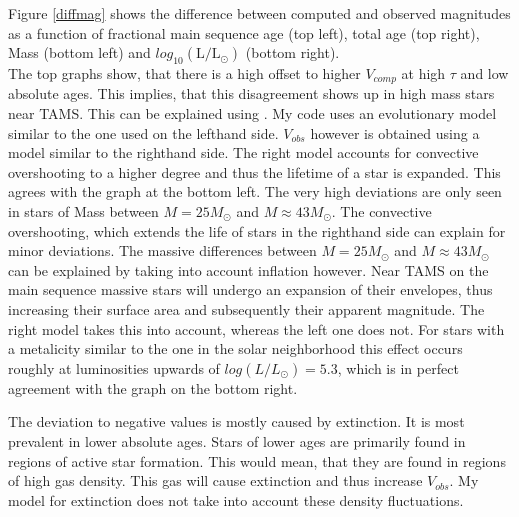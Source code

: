 \documentclass[a4paper,10pt]{article}
\begin{document}
 Figure \ref{diffmag} shows the difference between computed and observed magnitudes as a function of fractional main sequence age (top left),
 total age (top right), Mass (bottom left) and $log_{10}(\mathrm{L}/\mathrm{L}_\odot)$ (bottom right). \\
 The top graphs show, that there is a high offset to higher $V_{comp}$ at high $\tau$ and low absolute ages. This implies, that this 
 disagreement shows up in high mass stars near TAMS. This can be explained using \citep[figure 1]{2014A&A...570L..13C}. My code uses
 an evolutionary model similar to the one used on the lefthand side. $V_{obs}$ however is obtained using a model similar to the righthand
 side. The right model accounts for convective overshooting to a higher degree and thus the lifetime of a star is expanded. This agrees
 with the graph at the bottom left. The very high deviations are only seen in stars of Mass between $M=25M_\odot$ and $M\approx43M_\odot$.
 The convective overshooting, which extends the life of stars in the righthand side can explain for minor deviations. The massive differences
 between $M=25M_\odot$ and $M\approx 43M_\odot$ can be explained by taking into account inflation however. Near TAMS on the
 main sequence massive stars will undergo an expansion of their envelopes, thus increasing their surface area and subsequently their apparent
 magnitude. The right model takes this into account, whereas the left one 
 does not. For stars with a metalicity similar to the one in the solar neighborhood this effect occurs roughly at luminosities upwards of 
 $log(L/L_\odot)=5.3$, which is in perfect agreement with the graph on the bottom right.
 
 
 The deviation to negative values is mostly caused by extinction. It is most prevalent in lower absolute ages. 
 Stars of lower ages are primarily found in regions of active star formation. This would mean, that they are found in regions
 of high gas density. This gas will cause extinction and thus increase $V_{obs}$. My model for extinction does not take into account 
 these density fluctuations.
 
\end{document}
